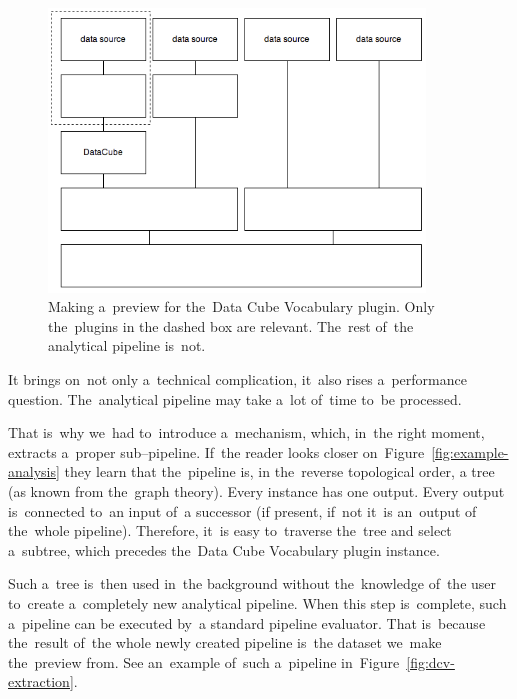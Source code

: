 \begin{figure}
	\centering
	\includegraphics[width=100mm]{img/dcv-preview-useful.png}
	\caption{Making a~preview for the~Data Cube Vocabulary plugin. Only the~plugins in
	the dashed box are relevant. The~rest of~the analytical pipeline is~not.}
	\label{fig:dcv-preview-useful}
\end{figure}

It brings on~not only a~technical complication, it~also rises a~performance 
question. The~analytical pipeline may take a~lot of~time to~be processed.

That is~why we~had to~introduce a~mechanism, which, in~the right moment, 
extracts a~proper sub--pipeline. If~the reader looks closer on~Figure~\ref{fig:example-analysis} they learn that the~pipeline is,
in the~reverse topological order, 
a tree (as known from the~graph theory). Every instance has 
one output. Every output is~connected to~an input of~a successor (if present, if~not it~is an~output
of the~whole pipeline). Therefore, it~is easy to~traverse the~tree and select a~subtree, which precedes the~Data Cube Vocabulary plugin instance.

Such a~tree is~then used in~the background without the~knowledge of~the user to~create a~completely new analytical pipeline. When this step is~complete, such a~pipeline can 
be executed by~a standard pipeline evaluator. That is~because the~result of~the whole 
newly created pipeline is~the dataset we~make the~preview from.
See an~example of~such a~pipeline in~Figure~\ref{fig:dcv-extraction}.

